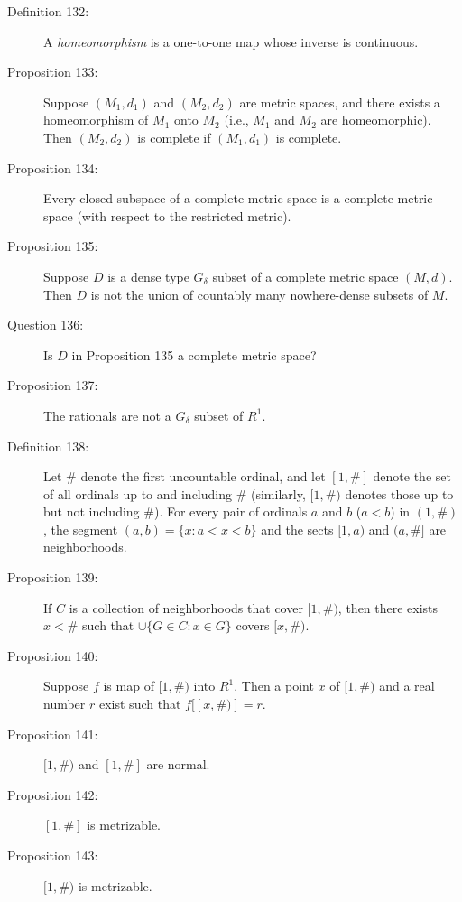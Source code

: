 \documentclass{article}
\begin{document}
\begin{description}
  \item[Definition 132:] A \emph{homeomorphism} is a one-to-one map whose inverse is continuous.

  \item[Proposition 133:] Suppose $(M_1, d_1)$ and $(M_2, d_2)$ are metric spaces, and there exists a homeomorphism of $M_1$ onto $M_2$ (i.e., $M_1$ and $M_2$ are homeomorphic). Then $(M_2, d_2)$ is complete if $(M_1, d_1)$ is complete.

  \item[Proposition 134:] Every closed subspace of a complete metric space is a complete metric space (with respect to the restricted metric).

  \item[Proposition 135:] Suppose $D$ is a dense type $G_{\delta}$ subset of a complete metric space $(M,d)$. Then $D$ is not the union of countably many nowhere-dense subsets of $M$.

  \item[Question 136:] Is $D$ in Proposition 135 a complete metric space?

  \item[Proposition 137:] The rationals are not a $G_{\delta}$ subset of $R^1$.

  \item[Definition 138:] Let $\#$ denote the first uncountable ordinal, and let $[1,\#]$ denote the set of all ordinals up to and including $\#$ (similarly, $[1,\#)$ denotes those up to but not including $\#$). For every pair of ordinals $a$ and $b$ ($a < b$) in $(1,\#)$, the segment $(a, b) = \{ x: a < x < b \}$ and the sects $[1,a)$ and $(a,\#]$ are neighborhoods.

  \item[Proposition 139:] If $C$ is a collection of neighborhoods that cover $[1,\#)$, then there exists $x < \#$ such that $\cup \{ G \in C: x \in G \}$ covers $[x,\#)$.

  \item[Proposition 140:] Suppose $f$ is map of $[1,\#)$ into $R^1$. Then a point $x$ of $[1,\#)$ and a real number $r$ exist such that $f[ [x,\#) ] = r$.

  \item[Proposition 141:] $[1,\#)$ and $[1,\#]$ are normal.

  \item[Proposition 142:] $[1,\#]$ is metrizable.

  \item[Proposition 143:] $[1,\#)$ is metrizable.


\end{description}
\end{document}
